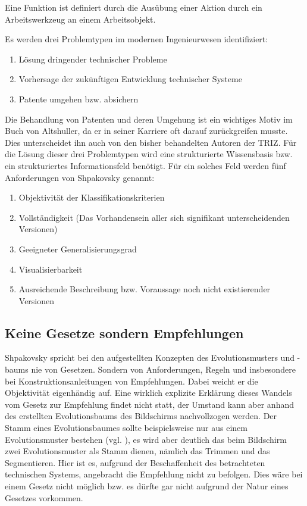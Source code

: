 \documentclass[11pt,a4paper]{article}
\begin{document}
Eine Funktion ist definiert durch die Ausübung einer Aktion durch ein Arbeitswerkzeug an einem Arbeitsobjekt.



Es werden drei Problemtypen im modernen Ingenieurwesen identifiziert:

\begin{enumerate}
    \item Lösung dringender technischer Probleme
    \item Vorhersage der zukünftigen Entwicklung technischer Systeme
    \item Patente umgehen bzw. absichern
\end{enumerate}

Die Behandlung von Patenten und deren Umgehung ist ein wichtiges Motiv im Buch von Altshuller, da er in seiner Karriere oft darauf zurückgreifen musste. Dies unterscheidet ihn auch von den bisher behandelten Autoren der TRIZ.
Für die Lösung dieser drei Problemtypen wird eine strukturierte Wissensbasis bzw. ein strukturiertes Informationsfeld benötigt. Für ein solches Feld werden fünf Anforderungen von Shpakovsky genannt:

\begin{enumerate}
    \item Objektivität der Klassifikationskriterien
    \item Vollständigkeit (Das Vorhandensein aller sich signifikant unterscheidenden Versionen)
    \item Geeigneter Generalisierungsgrad
    \item Visualisierbarkeit
    \item Ausreichende Beschreibung bzw. Voraussage noch nicht existierender Versionen
\end{enumerate}

\subsection{Keine Gesetze sondern Empfehlungen}
Shpakovsky spricht bei den aufgestellten Konzepten des Evolutionsmusters und -baums nie von Gesetzen. Sondern von Anforderungen, Regeln und insbesondere bei Konstruktionsanleitungen von Empfehlungen. Dabei weicht er die Objektivität eigenhändig auf. Eine wirklich explizite Erklärung dieses Wandels vom Gesetz zur Empfehlung findet nicht statt, der Umstand kann aber anhand des erstellten Evolutionsbaums des Bildschirms nachvollzogen werden.
Der Stamm eines Evolutionsbaumes sollte beispielsweise nur aus einem Evolutionsmuster bestehen (vgl. \cite[S. 122f]{evo}), es wird aber deutlich das beim Bildschirm zwei Evolutionsmuster als Stamm dienen, nämlich das Trimmen und das Segmentieren.
Hier ist es, aufgrund der Beschaffenheit des betrachteten technischen Systems, angebracht die Empfehlung nicht zu befolgen. Dies wäre bei einem Gesetz nicht möglich bzw. es dürfte gar nicht aufgrund der Natur eines Gesetzes vorkommen.
\end{document}
